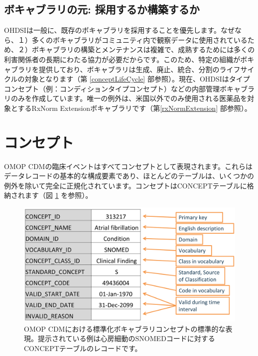 \documentclass[
  11pt]{book}
\theoremstyle{definition}
\theoremstyle{definition}
\theoremstyle{definition}
\theoremstyle{definition}
\theoremstyle{remark}
\begin{document}
\subsection{ボキャブラリの元: 採用するか構築するか}\label{ux30dcux30adux30e3ux30d6ux30e9ux30eaux306eux5143-ux63a1ux7528ux3059ux308bux304bux69cbux7bc9ux3059ux308bux304b}

OHDSIは一般に、既存のボキャブラリを採用することを優先します。なぜなら、１）多くのボキャブラリがコミュニティ内で観察データに使用されているため、２）ボキャブラリの構築とメンテナンスは複雑で、成熟するためには多くの利害関係者の長期にわたる協力が必要だからです。このため、特定の組織がボキャブラリを提供しており、ボキャブラリは生成、廃止、統合、分割のライフサイクルの対象となります（第 \ref{conceptLifeCycle} 部参照）。現在、OHDSIはタイプコンセプト（例：コンディションタイプコンセプト）などの内部管理ボキャブラリのみを作成しています。唯一の例外は、米国以外でのみ使用される医薬品を対象とするRxNorm Extensionボキャブラリです（第\ref{rxNormExtension} 部参照）。

\section{コンセプト}\label{ux30b3ux30f3ux30bbux30d7ux30c8}

OMOP CDMの臨床イベントはすべてコンセプトとして表現されます。これらはデータレコードの基本的な構成要素であり、ほとんどのテーブルは、いくつかの例外を除いて完全に正規化されています。コンセプトはCONCEPTテーブルに格納されます（図 \ref{fig:concept} を参照）。

\begin{figure}

{\centering \includegraphics[width=0.9\linewidth]{images/StandardizedVocabularies/concept} 

}

\caption{OMOP CDMにおける標準化ボキャブラリコンセプトの標準的な表現。提示されている例は心房細動のSNOMEDコードに対するCONCEPTテーブルのレコードです。}\label{fig:concept}
\end{figure}
\end{document}
